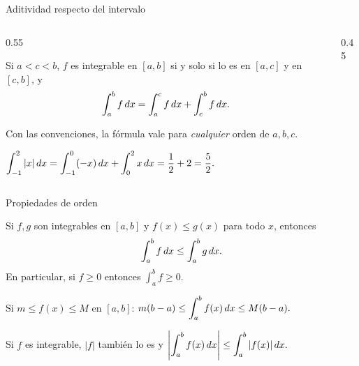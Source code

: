 \documentclass[10pt,aspectratio=169]{beamer}
\begin{document}
\begin{frame}{Aditividad respecto del intervalo}
  \begin{columns}
    \begin{column}{0.55\textwidth}
      \begin{teorema}[Aditividad]
        Si $a<c<b$, $f$ es integrable en $[a,b]$ si y solo si lo es en $[a,c]$ y en $[c,b]$, y
        \[ \int_a^bf\,dx=\int_a^cf\,dx+\int_c^bf\,dx. \]
      \end{teorema}
      Con las convenciones, la fórmula vale para \emph{cualquier} orden de $a,b,c$.
      \begin{ejemplo}
        $\displaystyle\int_{-1}^2|x|\,dx=\int_{-1}^0(-x)\,dx+\int_0^2x\,dx=\frac12+2=\frac52.$
      \end{ejemplo}
    \end{column}
    \begin{column}{0.45\textwidth}
      \centering
    \end{column}
  \end{columns}
\end{frame}

\begin{frame}{Propiedades de orden}
  \begin{teorema}[Monotonía]
    Si $f,g$ son integrables en $[a,b]$ y $f(x)\le g(x)$ para todo $x$, entonces
    \[ \int_a^bf\,dx\le\int_a^bg\,dx. \]
    En particular, si $f\ge0$ entonces $\int_a^bf\ge0$.
  \end{teorema}
  \begin{teorema}[Acotación]
    Si $m\le f(x)\le M$ en $[a,b]$:\qquad
    $\displaystyle m(b-a)\le\int_a^bf(x)\,dx\le M(b-a).$
  \end{teorema}
  \begin{teorema}
    Si $f$ es integrable, $|f|$ también lo es y\qquad
    $\displaystyle\left|\int_a^bf(x)\,dx\right|\le\int_a^b|f(x)|\,dx.$
  \end{teorema}
\end{frame}
\end{document}

